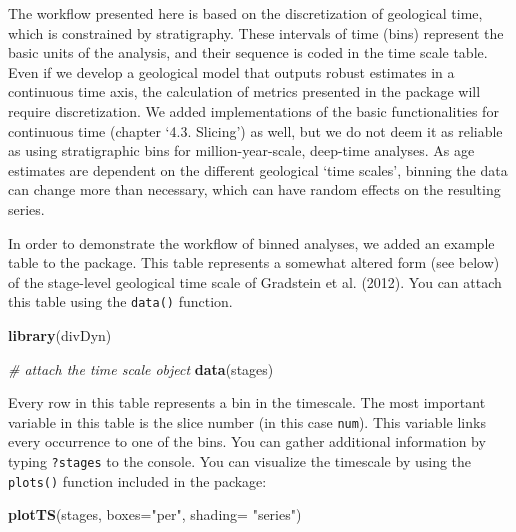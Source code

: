 \documentclass[]{article}
\newenvironment{Shaded}{\begin{snugshade}}{\end{snugshade}}
\newcommand{\CommentTok}[1]{\textcolor[rgb]{0.56,0.35,0.01}{\textit{#1}}}
\newcommand{\DataTypeTok}[1]{\textcolor[rgb]{0.13,0.29,0.53}{#1}}
\newcommand{\KeywordTok}[1]{\textcolor[rgb]{0.13,0.29,0.53}{\textbf{#1}}}
\newcommand{\NormalTok}[1]{#1}
\newcommand{\StringTok}[1]{\textcolor[rgb]{0.31,0.60,0.02}{#1}}
\begin{document}
The workflow presented here is based on the discretization of geological
time, which is constrained by stratigraphy. These intervals of time
(bins) represent the basic units of the analysis, and their sequence is
coded in the time scale table. Even if we develop a geological model
that outputs robust estimates in a continuous time axis, the calculation
of metrics presented in the package will require discretization. We
added implementations of the basic functionalities for continuous time
(chapter `4.3. Slicing') as well, but we do not deem it as reliable as
using stratigraphic bins for million-year-scale, deep-time analyses. As
age estimates are dependent on the different geological `time scales',
binning the data can change more than necessary, which can have random
effects on the resulting series.

In order to demonstrate the workflow of binned analyses, we added an
example table to the package. This table represents a somewhat altered
form (see below) of the stage-level geological time scale of Gradstein
et al. (2012). You can attach this table using the \texttt{data()}
function.

\begin{Shaded}
\begin{Highlighting}[]
\KeywordTok{library}\NormalTok{(divDyn)}
\end{Highlighting}
\end{Shaded}

\begin{Shaded}
\begin{Highlighting}[]
\CommentTok{# attach the time scale object}
\KeywordTok{data}\NormalTok{(stages)}
\end{Highlighting}
\end{Shaded}

Every row in this table represents a bin in the timescale. The most
important variable in this table is the slice number (in this case
\texttt{num}). This variable links every occurrence to one of the bins.
You can gather additional information by typing \texttt{?stages} to the
console. You can visualize the timescale by using the \texttt{plots()}
function included in the package:

\begin{Shaded}
\begin{Highlighting}[]
\KeywordTok{plotTS}\NormalTok{(stages, }\DataTypeTok{boxes=}\StringTok{"per"}\NormalTok{, }\DataTypeTok{shading=} \StringTok{"series"}\NormalTok{)}
\end{Highlighting}
\end{Shaded}
\end{document}
